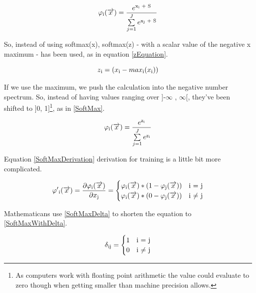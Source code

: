 \documentclass[11pt]{article}
\begin{document}
\begin{equation}
\label{SoftMaxConstant}
\varphi\textsubscript{i}(\overrightarrow{x}) =
\frac{e\textsuperscript{x\textsubscript{i} + S}}{\sum\limits_{j=1}^J e\textsuperscript{x\textsubscript{j} + S}}
\end{equation}

So, instead of using softmax(x), softmax(z) - with a scalar value of the negative x maximum - has been used, as in equation \eqref{zEquation}.

\begin{equation}
\label{zEquation}
z\textsubscript{i} = (x\textsubscript{i} - max\textsubscript{i}(x\textsubscript{i}))
\end{equation}

If we use the maximum, we push the calculation into the negative number spectrum. So, instead of having values ranging over ]-$\infty$ , $\infty$[, they've been shifted to ]0, 1]\footnote{As computers work with floating point arithmetic the value could evaluate to zero though when getting smaller than machine precision allows.}, as in \eqref{SoftMax}.

\begin{equation}
\label{SoftMax}
\varphi\textsubscript{i}(\overrightarrow{x}) =
\frac{e\textsuperscript{z\textsubscript{i}}}{\sum\limits_{j=1}^J e\textsuperscript{z\textsubscript{i}}}
\end{equation}

Equation \eqref{SoftMaxDerivation} derivation for training is a little bit more complicated.

\begin{equation}
\label{SoftMaxDerivation}
\varphi'\textsubscript{i}(\overrightarrow{x}) = \frac{\partial\varphi\textsubscript{i}(\overrightarrow{x})}{\partial x\textsubscript{j}} =\begin{cases}
\varphi\textsubscript{i}(\overrightarrow{x}) * (1 - \varphi\textsubscript{j}(\overrightarrow{x})) & \text{i = j}\\
\varphi\textsubscript{i}(\overrightarrow{x}) * (0 - \varphi\textsubscript{j}(\overrightarrow{x})) & \text{i $\neq$ j}
\end{cases}
\end{equation}

Mathematicans use \eqref{SoftMaxDelta} to shorten the equation to \eqref{SoftMaxWithDelta}.

\begin{equation}
\label{SoftMaxDelta}
\delta\textsubscript{ij} = \begin{cases}
1 & \text{i = j}\\
0 & \text{i $\neq$ j}
\end{cases}
\end{equation}
\end{document}

